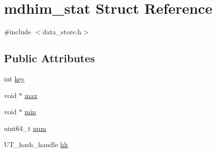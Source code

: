 \hypertarget{structmdhim__stat}{\section{mdhim\-\_\-stat Struct Reference}
\label{structmdhim__stat}
}


{\ttfamily \#include $<$data\-\_\-store.\-h$>$}

\subsection*{Public Attributes}
\begin{DoxyCompactItemize}
\item 
int \hyperlink{structmdhim__stat_a8257aee706371a50726235fcb5d1cb6c}{key}
\item 
void $\ast$ \hyperlink{structmdhim__stat_ae563344828e5e734dc924d6192f5fde4}{max}
\item 
void $\ast$ \hyperlink{structmdhim__stat_a66250dbd1b7be13842e4679ca46513b0}{min}
\item 
uint64\-\_\-t \hyperlink{structmdhim__stat_a0630c9382b160becabc1eef79cedb95c}{num}
\item 
U\-T\-\_\-hash\-\_\-handle \hyperlink{structmdhim__stat_a7efece810db77a787513ba5577800d7a}{hh}
\end{DoxyCompactItemize}


